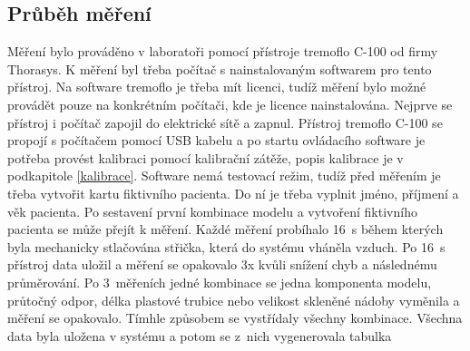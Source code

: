 \subsection{Průběh měření}
Měření bylo prováděno v laboratoři pomocí přístroje tremoflo C-100 od firmy Thorasys. K měření byl třeba počítač s nainstalovaným softwarem pro tento přístroj. Na software tremoflo je třeba mít licenci, tudíž měření bylo možné provádět pouze na konkrétním počítači, kde je licence nainstalována.  Nejprve se přístroj i počítač zapojil do elektrické sítě a zapnul. Přístroj tremoflo C-100 se propojí s počítačem pomocí USB kabelu a po startu ovládacího software je potřeba provést kalibraci pomocí kalibrační zátěže, popis kalibrace je v podkapitole \ref{kalibrace}. Software nemá testovací režim, tudíž před měřením je třeba vytvořit kartu fiktivního pacienta. Do ní je třeba vyplnit  jméno, příjmení a věk pacienta. Po sestavení první kombinace modelu a vytvoření fiktivního pacienta se může přejít k měření. Každé měření probíhalo  \SI{16}{s} během kterých byla mechanicky stlačována střička, která do systému vháněla vzduch. Po  \SI{16}{s} přístroj data uložil a měření se opakovalo 3x kvůli snížení chyb a následnému průměrování. Po 3~měřeních jedné kombinace se jedna komponenta modelu, průtočný odpor, délka plastové trubice nebo velikost skleněné nádoby vyměnila a měření se opakovalo. Tímhle způsobem se vystřídaly všechny kombinace. Všechna data byla uložena v systému a potom se z~nich vygenerovala tabulka

